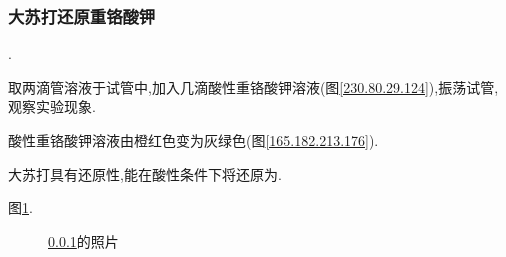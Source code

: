 \documentclass[hyperref,UTF8]{ctexart}
\begin{document}
\subsubsection{大苏打还原重铬酸钾}\label{162.233.161.254}

.

取两滴管溶液于试管中,加入几滴酸性重铬酸钾溶液(图\ref{230.80.29.124}),振荡试管,观察实验现象.

酸性重铬酸钾溶液由橙红色变为灰绿色(图\ref{165.182.213.176}).

大苏打具有还原性,能在酸性条件下将还原为.

图\ref{21.229.178.37}.

\begin{figure}[h]
    \centering
    \hspace{1in}
    \caption{\ref{162.233.161.254}的照片}
    \label{21.229.178.37}
\end{figure}
\end{document}
